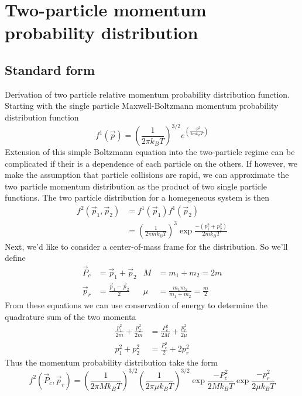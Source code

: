 \chapter{Two-particle momentum probability distribution} \label{app:momDistDer}

\section{Standard form} \label{sec:standardDist}
Derivation of two particle relative momentum probability distribution function.
Starting with the single particle Maxwell-Boltzmann momentum probability distribution function
\begin{equation} 
\label{eq:single_particle_prob}
		 f^1( \vec{p} ) = \left(\frac{1}{2 \pi k_B T}\right)^{3/2} e^{\left(\frac{-p^2}{2 m k_B T}\right)}
\end{equation}
Extension of this simple Boltzmann equation into the two-particle regime can be complicated if their is a dependence of each particle on the others. 
If however, we make the assumption that particle collisions are rapid, we can approximate the two particle momentum distribution as the product of two single particle functions. 
The two particle distribution for a homegeneous system is then
\begin{equation}
\label{eq:two_particle_prob}
\begin{split}
		 f^2( \vec{p}_1, \vec{p}_2 ) &= f^1( \vec{p}_1 ) f^1( \vec{p}_2 ) \\
		  &= \left(\frac{1}{2 \pi m k_B T}\right)^3 \exp{\frac{-(p_1^2 + p_2^2)}{2 m k_B T}}
\end{split}
\end{equation}
Next, we'd like to consider a center-of-mass frame for the distribution. So we'll define
\begin{align*}
	\vec{P}_c & = \vec{p}_1 + \vec{p}_2             &	M   &= m_1 + m_2 = 2m \\
	\vec{p}_r & = \frac{\vec{p}_1 - \vec{p}_2}{2}   &   \mu &= \frac{m_1 m_2}{m_1 + m_2} = \frac{m}{2}
\end{align*}
From these equations we can use conservation of energy to determine the quadrature sum of the two momenta
\begin{align*}
	\frac{p_1^2}{2m} + \frac{p_2^2}{2m} &= \frac{P_c^2}{2M} + \frac{p_r^2}{2\mu} \\
	p_1^2 + p_2^2 &= \frac{P_c^2}{2} + 2 p_r^2
\end{align*}
Thus the momentum probability distribution take the form
\begin{equation} \label{eq:two_particle_prob_inf_atomFrame}
		 f^2( \vec{P}_c, \vec{p}_r ) = \left(\frac{1}{2 \pi M k_B T}\right)^{3/2} \left(\frac{1}{2 \pi \mu k_B T}\right)^{3/2} 
		 \exp{\frac{-P_c^2}{2 M k_B T}} \exp{\frac{-p_r^2}{2 \mu k_B T}}
\end{equation}


